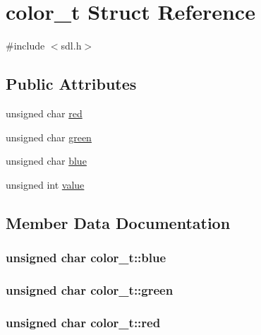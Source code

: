 \hypertarget{structcolor__t}{}\section{color\+\_\+t Struct Reference}
\label{structcolor__t}


{\ttfamily \#include $<$sdl.\+h$>$}

\subsection*{Public Attributes}
\begin{DoxyCompactItemize}
\item 
unsigned char \hyperlink{structcolor__t_ac498f95c1c5217d2033d5bbcb689f0c3}{red}
\item 
unsigned char \hyperlink{structcolor__t_a85e1636e41c5772cf432e4612ed00310}{green}
\item 
unsigned char \hyperlink{structcolor__t_ae7b396dd4ef019a28101fffe17ac33af}{blue}
\item 
unsigned int \hyperlink{structcolor__t_ae346ea49d8896a5233739803fdc1671c}{value}
\end{DoxyCompactItemize}


\subsection{Member Data Documentation}
\subsubsection[{\texorpdfstring{blue}{blue}}]{\setlength{\rightskip}{0pt plus 5cm}unsigned char color\+\_\+t\+::blue}\hypertarget{structcolor__t_ae7b396dd4ef019a28101fffe17ac33af}{}\label{structcolor__t_ae7b396dd4ef019a28101fffe17ac33af}
\subsubsection[{\texorpdfstring{green}{green}}]{\setlength{\rightskip}{0pt plus 5cm}unsigned char color\+\_\+t\+::green}\hypertarget{structcolor__t_a85e1636e41c5772cf432e4612ed00310}{}\label{structcolor__t_a85e1636e41c5772cf432e4612ed00310}
\subsubsection[{\texorpdfstring{red}{red}}]{\setlength{\rightskip}{0pt plus 5cm}unsigned char color\+\_\+t\+::red}\hypertarget{structcolor__t_ac498f95c1c5217d2033d5bbcb689f0c3}{}\label{structcolor__t_ac498f95c1c5217d2033d5bbcb689f0c3}
